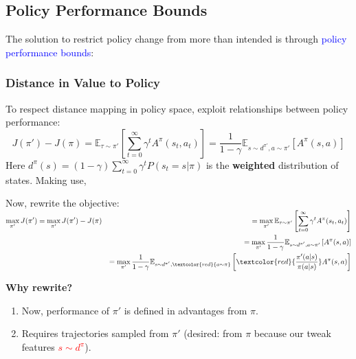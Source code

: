 \documentclass{article}
\begin{document}
    \subsection{Policy Performance Bounds}
    The solution to restrict policy change from more than intended is through \textcolor{blue}{policy performance bounds}:
    \begin{defbox}
        \subsubsection*{Distance in Value to Policy}
        To respect distance mapping in policy space, exploit relationships between policy performance:
        \begin{equation*}
            J(\pi') - J(\pi) = \mathbb{E}_{\tau \sim \pi'} \left[ \sum_{t = 0}^{\infty} \gamma^{t} A^{\pi}(s_t, a_t) \right]
            = \frac{1}{1-\gamma} \mathbb{E}_{s \sim d^{\pi'}, a \sim \pi'} \left[ A^{\pi} (s, a) \right]
        \end{equation*}
        Here $d^{\pi}(s) = (1 - \gamma) \sum_{t = 0}^{\infty} \gamma^{t} P(s_t = s | \pi)$ is the \textbf{weighted} distribution of states. Making use,

        Now, rewrite the objective:
        $\begin{aligned}
            \mathop{\max}\limits_{\pi'} J(\pi') & = \mathop{\max}\limits_{\pi'} J(\pi') - J(\pi) & = \mathop{\max}\limits_{\pi'} \mathbb{E}_{\tau \sim \pi'} \left[ \sum_{t = 0}^{\infty} \gamma^{t} A^{\pi}(s_t, a_t) \right] \\
            & & = \mathop{\max}\limits_{\pi'} \frac{1}{1-\gamma} \mathbb{E}_{s \sim d^{\pi'}, a \sim \pi'} \left[ A^{\pi} (s, a) \right] \\ 
            & & = \mathop{\max}\limits_{\pi'} \frac{1}{1-\gamma} \mathbb{E}_{s \sim d^{\pi'}, \textcolor{red}{a \sim \pi}} \left[ \textcolor{red}{\frac{\pi' (a | s)}{\pi(a | s)}} A^{\pi} (s, a) \right]
        \end{aligned}$
    \end{defbox}

    \textbf{Why rewrite?}
    \begin{enumerate}
    \item Now, performance of $\pi'$ is defined in advantages from $\pi$.
    \item Requires trajectories sampled from $\pi'$ (desired: from $\pi$ because our tweak features \textcolor{red}{$s \sim d^{\pi}$}).
    \end{enumerate}
\end{document}
